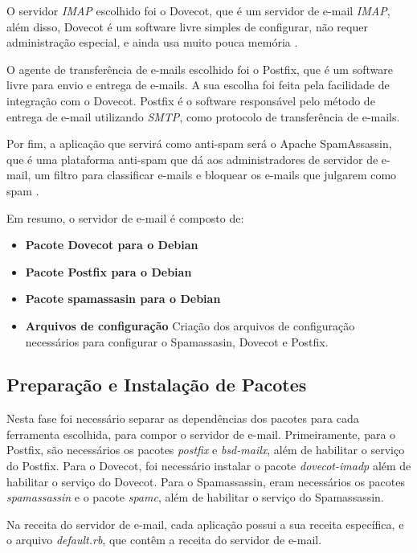 O servidor \textit{IMAP} escolhido foi o Dovecot, que é um servidor de e-mail
\textit{IMAP}, além disso, Dovecot é um software livre simples de configurar, não requer 
administração especial, e ainda usa muito pouca memória \cite{dovecot}. 

O agente de transferência de e-mails escolhido foi o Postfix, que é um software
livre para envio e entrega de e-mails. A sua escolha foi feita pela facilidade de
integração com o Dovecot. Postfix é o software responsável pelo método de entrega de e-mail
utilizando \textit{SMTP}, como protocolo de transferência de e-mails. 

Por fim, a aplicação que servirá como anti-spam será o Apache SpamAssassin, que 
é uma plataforma anti-spam que dá aos administradores de servidor de e-mail, 
um filtro para classificar e-mails e bloquear os e-mails que julgarem como spam \cite{spam}. 

Em resumo, o servidor de e-mail é composto de:

\begin{itemize}
   \item \textbf{Pacote Dovecot para o Debian}
   \item \textbf{Pacote Postfix para o Debian}
   \item \textbf{Pacote spamassasin para o Debian}
   \item \textbf{Arquivos de configuração} Criação dos arquivos de configuração
   necessários para configurar o Spamassasin, Dovecot e Postfix.
\end{itemize}

\subsection{Preparação e Instalação de Pacotes }

Nesta fase foi necessário separar as dependências dos pacotes para cada ferramenta
escolhida, para compor o servidor de e-mail. Primeiramente, para o Postfix, são necessários
os pacotes \textit{postfix} e \textit{bsd-mailx}, além de habilitar o serviço do 
Postfix. Para o Dovecot,
foi necessário instalar o pacote \textit{dovecot-imadp} além de habilitar o serviço do Dovecot. 
Para o Spamassassin, eram necessários os pacotes \textit{spamassassin} e o pacote
 \textit{spamc}, além de habilitar o serviço do Spamassassin.

Na receita do servidor de e-mail, cada aplicação possui a sua receita específica,
e o arquivo \textit{default.rb}, que contêm a receita do servidor de e-mail. 

